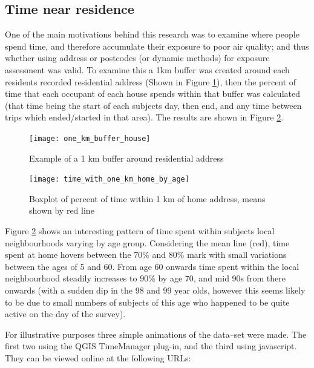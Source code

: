 \subsection{Time near residence}
\label{sec:time_near_residence}

One of the main motivations behind this research was to examine where people spend time, and therefore accumulate their exposure to poor air quality; and thus whether using address or postcodes (or dynamic methods) for exposure assessment was valid. To examine this a 1km buffer was created around each residents recorded residential address (Shown in Figure \ref{fig:one_km_buffer_house}), then the percent of time that each occupant of each house spends within that buffer was calculated (that time being the start of each subjects day, then end, and any time between trips which ended/started in that area). The results are shown in Figure \ref{fig:time_with_one_km_home_by_age}.

\begin{figure}[H]
\centering
\texttt{[image: one\_km\_buffer\_house]}
\caption{Example of a 1 km buffer around residential address}
\label{fig:one_km_buffer_house}
\end{figure}

\begin{landscape}

\begin{figure}[H]
\centering
\texttt{[image: time\_with\_one\_km\_home\_by\_age]}
\caption{Boxplot of percent of time within 1 km of home address, means shown by red line}
\label{fig:time_with_one_km_home_by_age}
\end{figure}

\end{landscape}

Figure \ref{fig:time_with_one_km_home_by_age} shows an interesting pattern of time spent within subjects local neighbourhoods varying by age group. Considering the mean line (red), time spent at home hovers between the 70\% and 80\% mark with small variations between the ages of 5 and 60. From age 60 onwards time spent within the local neighbourhood steadily increases to 90\% by age 70, and mid 90s from there onwards (with a sudden dip in the 98 and 99 year olds, however this seems likely to be due to small numbers of subjects of this age who happened to be quite active on the day of the survey).

For illustrative purposes three simple animations of the data--set were made. The first two using the QGIS TimeManager plug-in, and the third using javascript. They can be viewed online at the following URLs:

